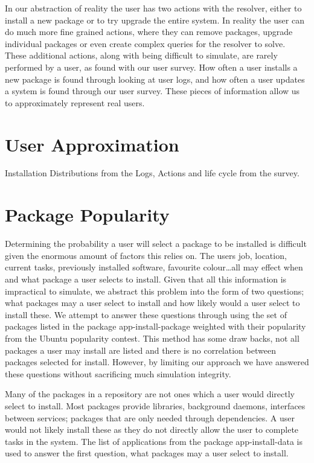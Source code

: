 In our abstraction of reality the user has two actions with the resolver, either to install a new package or to try upgrade the entire system.  
In reality the user can do much more fine grained actions, where they can remove packages, 
upgrade individual packages or even create complex queries for the resolver to solve. 
These additional actions, along with being difficult to simulate, are rarely performed by a user, as found with our user survey. %
How often a user installs a new package is found through looking at user logs, %
and how often a user updates a system is found through our user survey.
These pieces of information allow us to approximately represent real users.


\section{User Approximation}
Installation Distributions from the Logs, Actions and life cycle from the survey.

\section{Package Popularity}
{}Determining the probability a user will select a package to be installed is difficult given the enormous amount of factors this relies on.
{}The users job, location, current tasks, previously installed software, favourite colour\ldots all may effect when and what package a user selects to install.
{}Given that all this information is impractical to simulate, we abstract this problem into the form of two questions;
{}what packages may a user select to install and how likely would a user select to install these.
{}We attempt to answer these questions through using the set of packages listed in the package app-install-package
{}weighted with their popularity from the Ubuntu popularity contest.
{}This method has some draw backs, not all packages a user may install are listed and there is no correlation between packages selected for install.
{}However, by limiting our approach we have answered these questions without sacrificing much simulation integrity.

Many of the packages in a repository are not ones which a user would directly select to install.
Most packages provide libraries, background daemons, interfaces between services; packages that are only needed through dependencies.
A user would not likely install these as they do not directly allow the user to complete tasks in the system.
The list of applications from the package app-install-data is used to answer the first question, what packages may a user select to install.

